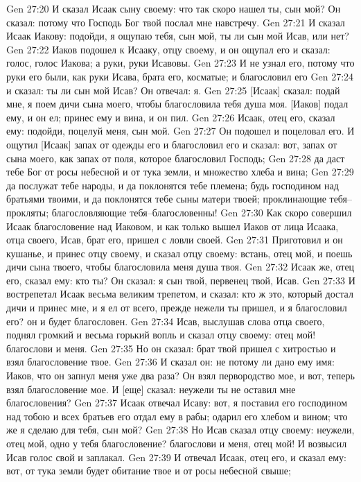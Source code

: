 Gen 27:20  И сказал Исаак сыну своему: что так скоро нашел ты, сын мой? Он сказал: потому что Господь Бог твой послал мне навстречу.
Gen 27:21  И сказал Исаак Иакову: подойди, я ощупаю тебя, сын мой, ты ли сын мой Исав, или нет?
Gen 27:22  Иаков подошел к Исааку, отцу своему, и он ощупал его и сказал: голос, голос Иакова; а руки, руки Исавовы.
Gen 27:23  И не узнал его, потому что руки его были, как руки Исава, брата его, косматые; и благословил его
Gen 27:24  и сказал: ты ли сын мой Исав? Он отвечал: я.
Gen 27:25  [Исаак] сказал: подай мне, я поем дичи сына моего, чтобы благословила тебя душа моя. [Иаков] подал ему, и он ел; принес ему и вина, и он пил.
Gen 27:26  Исаак, отец его, сказал ему: подойди, поцелуй меня, сын мой.
Gen 27:27  Он подошел и поцеловал его. И ощутил [Исаак] запах от одежды его и благословил его и сказал: вот, запах от сына моего, как запах от поля, которое благословил Господь;
Gen 27:28  да даст тебе Бог от росы небесной и от тука земли, и множество хлеба и вина;
Gen 27:29  да послужат тебе народы, и да поклонятся тебе племена; будь господином над братьями твоими, и да поклонятся тебе сыны матери твоей; проклинающие тебя--прокляты; благословляющие тебя--благословенны!
Gen 27:30  Как скоро совершил Исаак благословение над Иаковом, и как только вышел Иаков от лица Исаака, отца своего, Исав, брат его, пришел с ловли своей.
Gen 27:31  Приготовил и он кушанье, и принес отцу своему, и сказал отцу своему: встань, отец мой, и поешь дичи сына твоего, чтобы благословила меня душа твоя.
Gen 27:32  Исаак же, отец его, сказал ему: кто ты? Он сказал: я сын твой, первенец твой, Исав.
Gen 27:33  И вострепетал Исаак весьма великим трепетом, и сказал: кто ж это, который достал дичи и принес мне, и я ел от всего, прежде нежели ты пришел, и я благословил его? он и будет благословен.
Gen 27:34  Исав, выслушав слова отца своего, поднял громкий и весьма горький вопль и сказал отцу своему: отец мой! благослови и меня.
Gen 27:35  Но он сказал: брат твой пришел с хитростью и взял благословение твое.
Gen 27:36  И сказал он: не потому ли дано ему имя: Иаков, что он запнул меня уже два раза? Он взял первородство мое, и вот, теперь взял благословение мое. И [еще] сказал: неужели ты не оставил мне благословения?
Gen 27:37  Исаак отвечал Исаву: вот, я поставил его господином над тобою и всех братьев его отдал ему в рабы; одарил его хлебом и вином; что же я сделаю для тебя, сын мой?
Gen 27:38  Но Исав сказал отцу своему: неужели, отец мой, одно у тебя благословение? благослови и меня, отец мой! И возвысил Исав голос свой и заплакал.
Gen 27:39  И отвечал Исаак, отец его, и сказал ему: вот, от тука земли будет обитание твое и от росы небесной свыше;

